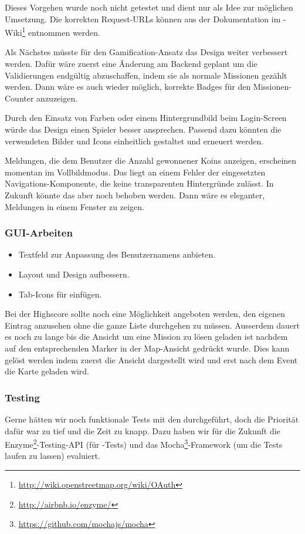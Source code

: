 Dieses Vorgehen wurde noch nicht getestet und dient nur als Idee zur möglichen Umsetzung.
Die korrekten Request-URLs können aus der Dokumentation im -Wiki\footnote{\url{http://wiki.openstreetmap.org/wiki/OAuth}} entnommen werden.

Als Nächstes müsste für den \gls{Gamification}-Ansatz das Design weiter verbessert werden. 
Dafür wäre zuerst eine Änderung am Backend geplant um die Validierungen endgültig abzuschaffen, indem sie als normale Missionen gezählt werden. 
Dann wäre es auch wieder möglich, korrekte Badges für den Missionen-Counter anzuzeigen. 

Durch den Einsatz von Farben oder einem Hintergrundbild beim Login-Screen würde das Design einen Spieler besser ansprechen. 
Passend dazu könnten die verwendeten Bilder und Icons einheitlich gestaltet und erneuert werden. 

Meldungen, die dem Benutzer die Anzahl gewonnener Koins anzeigen, erscheinen momentan im Vollbildmodus. 
Das liegt an einem Fehler der eingesetzten Navigations-Komponente, die keine transparenten Hintergründe zulässt. 
In Zukunft könnte das aber noch behoben werden. 
Dann wäre es eleganter, Meldungen in einem Fenster zu zeigen.

\subsubsection{GUI-Arbeiten}
\begin{itemize}
	\item Textfeld zur Anpassung des Benutzernamens anbieten.
	\item Layout und Design aufbessern.
	\item Tab-Icons für  einfügen.
\end{itemize}

Bei der Highscore sollte noch eine Möglichkeit angeboten werden, den eigenen Eintrag anzusehen ohne die ganze Liste durchgehen zu müssen.\newline
Ausserdem dauert es noch zu lange bis die Ansicht um eine Mission zu lösen geladen ist nachdem auf den entsprechenden Marker in der Map-Ansicht gedrückt wurde.
Dies kann gelöst werden indem zuerst die Ansicht dargestellt wird und erst nach dem Event  die Karte geladen wird.

\subsubsection{Testing}
Gerne hätten wir noch funktionale Tests mit den  durchgeführt, doch die Priorität dafür war zu tief und die Zeit zu knapp. 
Dazu haben wir für die Zukunft die Enzyme\footnote{\url{http://airbnb.io/enzyme/}}-Testing-API (für -Tests) und das Mocha\footnote{\url{https://github.com/mochajs/mocha}}-\gls{Framework} (um die Tests laufen zu lassen) evaluiert.

